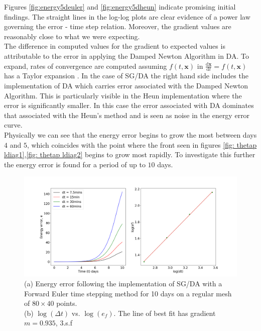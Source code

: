 Figures \ref{fig:energy5deuler} and \ref{fig:energy5dheun} indicate promising initial findings. The straight lines in the log-log plots are clear evidence of a power law governing the error - time step relation. Moreover, the gradient values are reasonably close to what we were expecting.\\
\linebreak
The difference in computed values for the gradient to expected values is attributable to the error in applying the Damped Newton Algorithm in DA. To expand, rates of convergence are computed assuming $f(t,\bm{x})$ in $\frac{\textrm{d}\bm{x}}{\textrm{d}t} = f(t,\bm{x})$ has a Taylor expansion \cite{Griffiths2010}. In the case of SG/DA the right hand side includes the implementation of DA which carries error associated with the Damped Newton Algorithm. This is particularly visible in the Heun implementation where the error is significantly smaller. In this case the error associated with DA dominates that associated with the Heun's method and is seen as noise in the energy error curve.\\
\linebreak
Physically we can see that the energy error begins to grow the most between days $4$ and $5$, which coincides with the point where the front seen in figures \ref{fig: thetap ldiag1},\ref{fig: thetap ldiag2} begins to grow most rapidly. To investigate this further the energy error is found for a period of up to $10$ days.
\newpage
\begin{figure}[ht]
	\centering
	\includegraphics[width=1.1\linewidth]{evaluation/energy_10D_euler}
	\caption[Energy Error from implementation of SG/DA via Forward Euler timestepping method for 10 days]{(a) Energy error following the implementation of SG/DA with a Forward Euler time stepping method for 10 days on a regular mesh of $80 \times 40$ points.\\ (b) $\log(\Delta t)$ vs. $\log(e_f)$. The line of best fit has gradient $m = 0.935$, 3.s.f}
	\label{fig:energy10deuler}
\end{figure}
